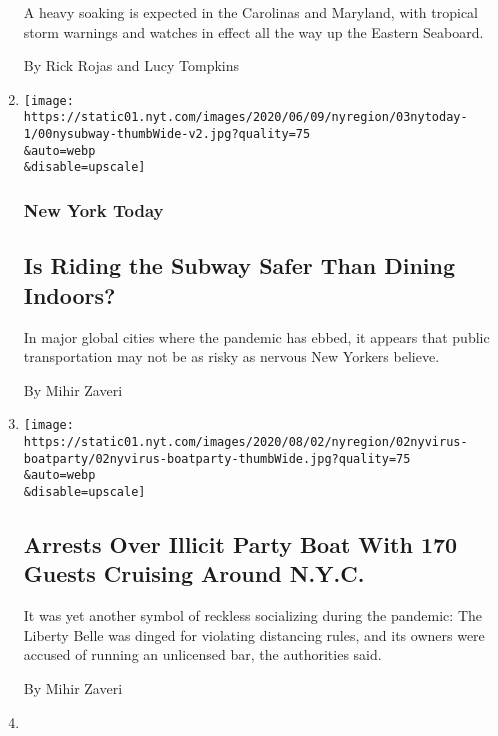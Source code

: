 \begin{enumerate}
  A heavy soaking is expected in the Carolinas and Maryland, with
  tropical storm warnings and watches in effect all the way up the
  Eastern Seaboard.

  By Rick Rojas and Lucy Tompkins
\item
  \href{/2020/08/03/nyregion/nyc-subway-coronavirus.html}{}

  \texttt{[image: https://static01.nyt.com/images/2020/06/09/nyregion/03nytoday-1/00nysubway-thumbWide-v2.jpg?quality=75\\\&auto=webp\\\&disable=upscale]}

  \hypertarget{new-york-today}{%
  \subsubsection{New York Today}\label{new-york-today}}

  \hypertarget{is-riding-the-subway-safer-than-dining-indoors}{%
  \subsection{Is Riding the Subway Safer Than Dining
  Indoors?}\label{is-riding-the-subway-safer-than-dining-indoors}}

  In major global cities where the pandemic has ebbed, it appears that
  public transportation may not be as risky as nervous New Yorkers
  believe.

  By Mihir Zaveri
\item
  \href{/2020/08/02/nyregion/liberty-belle-illegal-party.html}{}

  \texttt{[image: https://static01.nyt.com/images/2020/08/02/nyregion/02nyvirus-boatparty/02nyvirus-boatparty-thumbWide.jpg?quality=75\\\&auto=webp\\\&disable=upscale]}

  \hypertarget{arrests-over-illicit-party-boat-with-170-guests-cruising-around-nyc}{%
  \subsection{Arrests Over Illicit Party Boat With 170 Guests Cruising
  Around
  N.Y.C.}\label{arrests-over-illicit-party-boat-with-170-guests-cruising-around-nyc}}

  It was yet another symbol of reckless socializing during the pandemic:
  The Liberty Belle was dinged for violating distancing rules, and its
  owners were accused of running an unlicensed bar, the authorities
  said.

  By Mihir Zaveri
\item
  \href{/2020/07/31/nyregion/greenwich-ct-coronavirus-covid-parties.html}{}


\end{enumerate}
